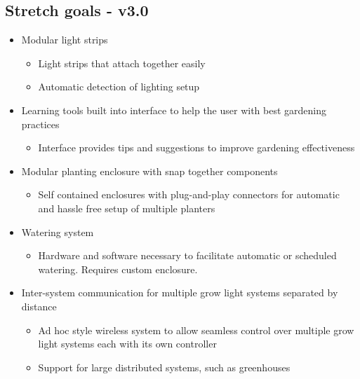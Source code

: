 \documentclass[onecolumn, draftclsnofoot,10pt, compsoc]{IEEEtran}
\begin{document}
	\subsection*{Stretch goals - v3.0}
	\begin{itemize}
		\item Modular light strips
			\begin{itemize}
				\item Light strips that attach together easily
				\item Automatic detection of lighting setup
			\end{itemize}
		\item Learning tools built into interface to help the user with best gardening practices
			\begin{itemize}
				\item Interface provides tips and suggestions to improve gardening effectiveness
			\end{itemize}
		\item Modular planting enclosure with snap together components
			\begin{itemize}
				\item Self contained enclosures with plug-and-play connectors for automatic and hassle free setup of multiple planters
			\end{itemize}
		\item Watering system
			\begin{itemize}
				\item Hardware and software necessary to facilitate automatic or scheduled watering. Requires custom enclosure.
			\end{itemize}
		\item Inter-system communication for multiple grow light systems separated by distance
			\begin{itemize}
				\item Ad hoc style wireless system to allow seamless control over multiple grow light systems each with its own controller
				\item Support for large distributed systems, such as greenhouses
			\end{itemize}
	\end{itemize}
\end{document}
